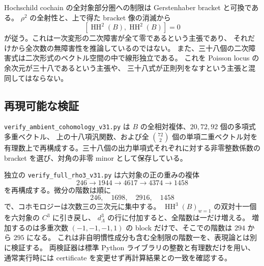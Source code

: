 Hochschild cochain の全対象部分圏への制限は Gerstenhaber bracket と可換である。
$\rho^2$ の全射性と、上で得た bracket 像の消滅から
\[
 [\operatorname{HH}^2(B),\operatorname{HH}^2(B)]=0
\]
が従う。これは一次変形の二次障害が全て零であるという主張であり、
それだけから全次数の無障害性を推論しているのではない。
また、三十八個の二次障害式は二次形式のベクトル空間の中で線形独立である。
これを Poisson locus の余次元が三十八であるという主張や、
三十八式が正則列をなすという主張と混同してはならない。

\subsection{再現可能な検証}

\texttt{verify\_ambient\_cohomology\_v31.py} は
$B$ の全相対複体、$20,72,92$ 個の多項式多重ベクトル、
上の十八項汎関数、および全 $\binom{72}{2}$ 個の単項二重ベクトル対を
有理数上で再構成する。三十八個の出力単項式それぞれに対する非零整数係数の
bracket を選び、対角の非零 minor として保存している。

独立の \texttt{verify\_full\_rho3\_v31.py} は六対象の正の重みの複体
\[
 246\longrightarrow1944\longrightarrow4617
 \longrightarrow4374\longrightarrow1458
\]
を再構成する。微分の階数は順に
\[
 246,\quad1698,\quad2916,\quad1458
\]
で、コホモロジーは次数三の三次元に集中する。
$\operatorname{HH}^3(B)_{w=1}$ の双対十一個を六対象の $C^3$ に引き戻し、
$d^3_\Lambda$ の行に付加すると、全階数は一だけ増える。
増加するのは多重次数 $(-1,-1,-1,1)$ の block だけで、そこでの階数は
$294$ から $295$ になる。
これは非自明慣性成分も含む全制限の階数一を、表現論とは別に検証する。
両検証器は標準 Python ライブラリの整数と有理数だけを用い、
通常実行時には certificate を変更せず再計算結果との一致を確認する。
